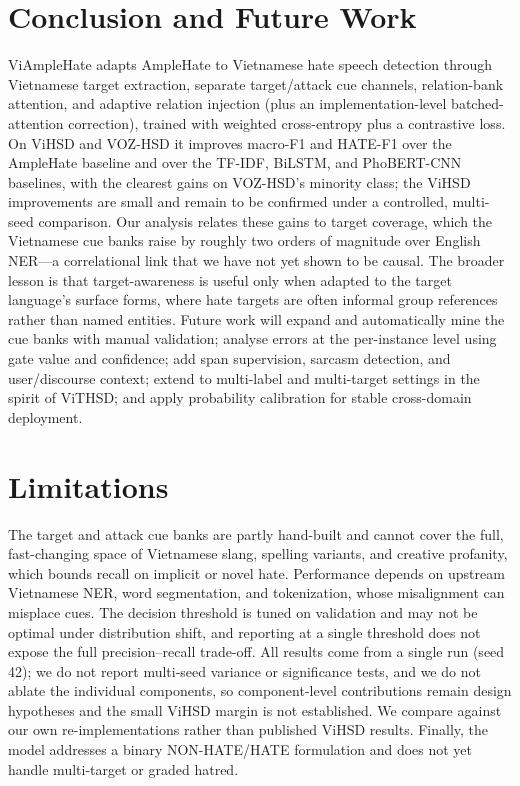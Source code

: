 \documentclass[11pt]{article}
\begin{document}
\section{Conclusion and Future Work}
ViAmpleHate adapts AmpleHate to Vietnamese hate speech detection through Vietnamese target extraction, separate target/attack cue channels, relation-bank attention, and adaptive relation injection (plus an implementation-level batched-attention correction), trained with weighted cross-entropy plus a contrastive loss. On ViHSD and VOZ-HSD it improves macro-F1 and HATE-F1 over the AmpleHate baseline and over the TF-IDF, BiLSTM, and PhoBERT-CNN baselines, with the clearest gains on VOZ-HSD's minority class; the ViHSD improvements are small and remain to be confirmed under a controlled, multi-seed comparison. Our analysis relates these gains to target coverage, which the Vietnamese cue banks raise by roughly two orders of magnitude over English NER---a correlational link that we have not yet shown to be causal. The broader lesson is that target-awareness is useful only when adapted to the target language's surface forms, where hate targets are often informal group references rather than named entities. Future work will expand and automatically mine the cue banks with manual validation; analyse errors at the per-instance level using gate value and confidence; add span supervision, sarcasm detection, and user/discourse context; extend to multi-label and multi-target settings in the spirit of ViTHSD; and apply probability calibration for stable cross-domain deployment.

\section*{Limitations}
The target and attack cue banks are partly hand-built and cannot cover the full, fast-changing space of Vietnamese slang, spelling variants, and creative profanity, which bounds recall on implicit or novel hate. Performance depends on upstream Vietnamese NER, word segmentation, and tokenization, whose misalignment can misplace cues. The decision threshold is tuned on validation and may not be optimal under distribution shift, and reporting at a single threshold does not expose the full precision--recall trade-off. All results come from a single run (seed 42); we do not report multi-seed variance or significance tests, and we do not ablate the individual components, so component-level contributions remain design hypotheses and the small ViHSD margin is not established. We compare against our own re-implementations rather than published ViHSD results. Finally, the model addresses a binary NON-HATE/HATE formulation and does not yet handle multi-target or graded hatred.
\end{document}
